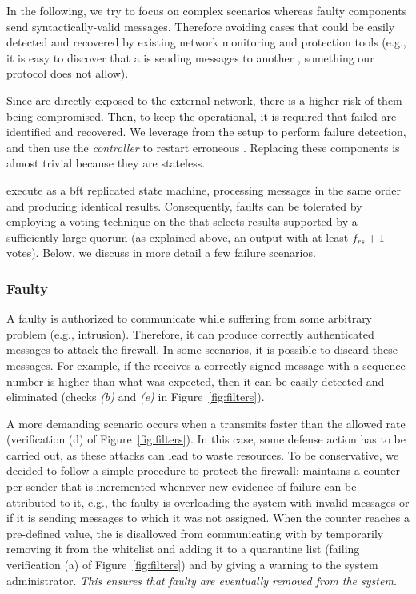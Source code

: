 In the following, we try to focus on complex scenarios whereas faulty components send syntactically-valid messages. 
Therefore avoiding cases that could be easily detected and recovered by existing network monitoring and protection tools (e.g., it is easy to discover that a \presieve is sending messages to another \presieve, something our protocol does not allow).

Since \presieves are directly exposed to the external network, there is a higher risk of them being compromised.
Then, to keep the \sieveq operational, it is required that failed \presieves are identified and recovered.
We leverage from the \repsieve setup to perform failure detection, and then use the \emph{controller} to restart erroneous \presieves.
Replacing these components is almost trivial because they are stateless.

\Repsieves execute as a \gls{bft} replicated state machine, processing messages in the same order and producing identical results.
Consequently, \repsieves faults can be tolerated by employing a voting technique on the \postsieve that selects results supported by a sufficiently large quorum (as explained above, an output with at least $f_{rs} + 1$ votes).
Below, we discuss in more detail a few failure scenarios.



\subsubsection{Faulty \Sender}
A faulty \sender is authorized to communicate while suffering from some arbitrary problem (e.g., intrusion). 
Therefore, it can produce correctly authenticated messages to attack the firewall. 
In some scenarios, it is possible to discard these messages. 
For example, if the \sieveq receives a correctly signed message with a sequence number is higher than what was expected, then it can be easily detected and eliminated (checks \emph{(b)} and \emph{(e)} in Figure~\ref{fig:filters}).

A more demanding scenario occurs when a \sender transmits faster than the allowed rate (verification (d) of Figure~\ref{fig:filters}).
In this case, some defense action has to be carried out, as these attacks can lead \sieveq to waste resources.
To be conservative, we decided to follow a simple procedure to protect the firewall: \sieveq maintains a counter per sender that is incremented whenever new evidence of failure can be attributed to it, e.g., the faulty \sender is overloading the system with invalid messages or if it is sending messages to \presieves which it was not assigned.
When the counter reaches a pre-defined value, the \sender is disallowed from communicating with \sieveq by temporarily removing it from the whitelist and adding it to a quarantine list (failing verification (a) of Figure~\ref{fig:filters}) and by giving a warning to the system administrator.
\emph{This ensures that faulty \emph{\senders} are eventually removed from the system.}

